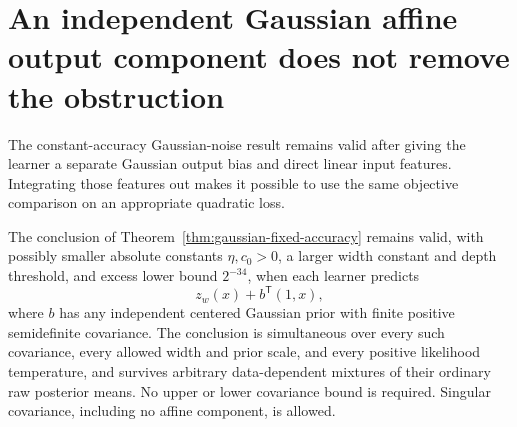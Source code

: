 \section{An independent Gaussian affine output component does not remove the obstruction}
\label{sec:affine-skip-fixed-accuracy}
The constant-accuracy Gaussian-noise result remains valid after giving the learner a separate Gaussian output bias and direct linear input features. Integrating those features out makes it possible to use the same objective comparison on an appropriate quadratic loss.

\begin{theorem}
\label{thm:affine-skip-fixed-accuracy}
The conclusion of Theorem~\ref{thm:gaussian-fixed-accuracy} remains valid, with possibly smaller absolute constants $\eta,c_0>0$, a larger width constant and depth threshold, and excess lower bound $2^{-34}$, when each learner predicts
\[
 z_w(x)+b^{\mathsf T}(1,x),
\]
where $b$ has any independent centered Gaussian prior with finite positive semidefinite covariance. The conclusion is simultaneous over every such covariance, every allowed width and prior scale, and every positive likelihood temperature, and survives arbitrary data-dependent mixtures of their ordinary raw posterior means. No upper or lower covariance bound is required. Singular covariance, including no affine component, is allowed.
\end{theorem}
